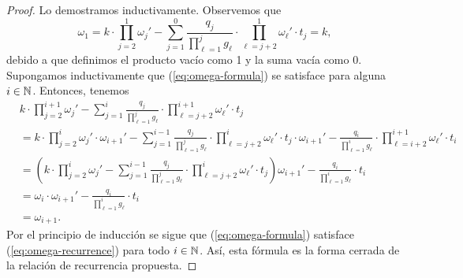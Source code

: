 \begin{proof}
	Lo demostramos inductivamente. Observemos que
	\begin{equation*}
		\omega_1 =
		k \cdot \prod_{j=2}^{1} \omega_j'
		- \sum_{j=1}^{0}\frac{q_j}{\prod_{\ell=1}^{j}g_\ell}
		\cdot \prod_{\ell=j+2}^{1}\omega_\ell' \cdot t_j
		= k,
	\end{equation*}
	debido a que definimos el producto vacío como 1 y la suma vacía como 0. Supongamos
	inductivamente que (\ref{eq:omega-formula}) se satisface para alguna $i \in \mathbb{N}$. Entonces,
	tenemos
	\begin{align*}
		&k \cdot \prod_{j=2}^{i + 1} \omega_j'
		- \sum_{j=1}^{i}\frac{q_j}{\prod_{\ell=1}^{j}g_\ell}
		\cdot \prod_{\ell=j+2}^{i + 1}\omega_\ell' \cdot t_j \\
		&=
		k \cdot \prod_{j=2}^{i} \omega_j' \cdot \omega_{i+1}'
		- \sum_{j=1}^{i - 1}\frac{q_j}{\prod_{\ell=1}^{j}g_\ell}
		\cdot \prod_{\ell=j+2}^{i}\omega_\ell' \cdot t_j \cdot \omega_{i + 1}'
		- \frac{q_i}{\prod_{\ell = 1}^{i}g_\ell}
		\cdot \prod_{\ell = i + 2}^{i + 1}\omega_\ell' \cdot t_i \\
		&= 
		\left( k \cdot \prod_{j=2}^{i} \omega_j'
		- \sum_{j=1}^{i - 1}\frac{q_j}{\prod_{\ell=1}^{j}g_\ell}
		\cdot \prod_{\ell=j+2}^{i}\omega_\ell' \cdot t_j \right) \omega_{i+1}'
		- \frac{q_i}{\prod_{\ell = 1}^{i}g_\ell} \cdot t_i  \\
		&= \omega_i \cdot \omega_{i + 1}' - \frac{q_i}{\prod_{\ell = 1}^{i}g_\ell} \cdot t_i \\
		&= \omega_{i+1}.
	\end{align*}
	Por el principio de inducción se sigue que (\ref{eq:omega-formula}) satisface
	(\ref{eq:omega-recurrence}) para todo $i \in \mathbb{N}$. Así, esta fórmula es la forma cerrada de la
	relación de recurrencia propuesta.
\end{proof}


